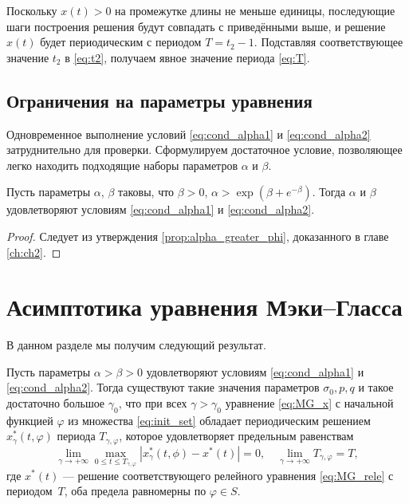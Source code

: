 Поскольку $x(t) > 0$ на промежутке длины не меньше единицы, последующие шаги построения решения будут совпадать с приведёнными выше, и решение $x(t)$ будет периодическим с периодом $T = t_2 - 1$. Подставляя соответствующее значение $t_2$ в \eqref{eq:t2}, получаем явное значение периода \eqref{eq:T}.


\subsection{Ограничения на параметры уравнения}

Одновременное выполнение условий \eqref{eq:cond_alpha1} и \eqref{eq:cond_alpha2} затруднительно для проверки. Сформулируем достаточное условие, позволяющее легко находить подходящие наборы параметров $\alpha$ и $\beta$.

\begin{theorem}
Пусть параметры $\alpha$, $\beta$ таковы, что $\beta > 0$, $\alpha > \exp(\beta + e^{-\beta})$. Тогда $\alpha$ и $\beta$ удовлетворяют условиям \eqref{eq:cond_alpha1} и \eqref{eq:cond_alpha2}.
\end{theorem}
\begin{proof}
	Следует из утверждения \ref{prop:alpha_greater_phi}, доказанного в главе \ref{ch:ch2}.
\end{proof}

\section{Асимптотика уравнения Мэки--Гласса}

В данном разделе мы получим следующий результат.

\begin{theorem}
    \label{thm:existence}
Пусть параметры $\alpha > \beta > 0$ удовлетворяют условиям \eqref{eq:cond_alpha1} и  \eqref{eq:cond_alpha2}. Тогда существуют такие значения параметров $\sigma_0, p, q$ и такое достаточно большое $\gamma_0$, что при всех $\gamma > \gamma_0$ уравнение \eqref{eq:MG_x} с начальной функцией $\varphi$ из множества \eqref{eq:init_set} обладает периодическим решением $x^*_\gamma(t, \varphi)$ периода $T_{\gamma, \varphi}$, которое удовлетворяет предельным равенствам 
\begin{equation}
\label{eq:lim_x*}
	\lim_{\gamma\to+\infty}\max_{0\leqslant t\leqslant T_{\gamma, \varphi}}|x_{\gamma}^*(t, \phi)-x^*(t)|=0,\quad \lim_{\gamma\to+\infty}T_{\gamma, \varphi} = T,
\end{equation}
где $x^*(t)$ --- решение соответствующего релейного уравнения \eqref{eq:MG_rele} с периодом~$T$, оба предела равномерны по $\varphi \in S$. 
\end{theorem}

